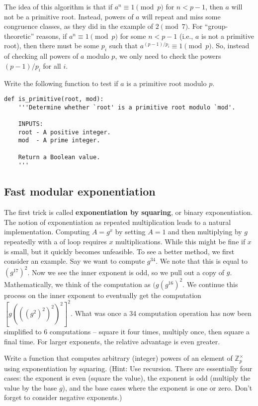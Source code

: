 The idea of this algorithm is that if $a^n \equiv 1 \pmod{p}$ for $n<p-1$, then $a$ will not be a primitive root.
Instead, powers of $a$ will repeat and miss some congruence classes, as they did in the example of $2 \pmod{7}$.
For ``group-theoretic'' reasons, if $a^n \equiv 1 \pmod{p}$ for some $n<p-1$ (i.e., $a$ is not a primitive root), then there must be some $p_i$ such that $a^{(p-1)/p_i} \equiv 1 \pmod{p}$.
So, instead of checking all powers of $a$ modulo $p$, we only need to check the powers $(p-1)/p_i$ for all $i$.

\begin{problem}
Write the following function to test if $a$ is a primitive root modulo $p$.
\begin{lstlisting}
def is_primitive(root, mod):
    '''Determine whether `root' is a primitive root modulo `mod'.
    
    INPUTS:
    root - A positive integer.
    mod  - A prime integer.
    
    Return a Boolean value.
    '''
\end{lstlisting}
\end{problem}


\subsection*{Fast modular exponentiation}



The first trick is called {\bf exponentiation by squaring}, or binary exponentiation. The notion of exponentiation as repeated multiplication leads to a natural implementation. Computing $A = g^x$ by setting $A=1$ and then multiplying by $g$ repeatedly with a of loop requires $x$ multiplications. While this might be fine if $x$ is small, but it quickly becomes unfeasible. To see a better method, we first consider an example. Say we want to compute $g^{34}$. We note that this is equal to $(g^{17})^2$. Now we see the inner exponent is odd, so we pull out a copy of $g$.  Mathematically, we think of the computation as $(g(g^{16})^2$. We continue this process on the inner exponent to eventually get the computation $[g(((g^2)^2)^2)^2]^2$. What was once a 34 computation operation has now been simplified to 6 computations -- square it four times, multiply once, then square a final time. For larger exponents, the relative advantage is even greater.

\begin{problem}
Write a function that computes arbitrary (integer) powers of an element of $\mathbb{Z}_p^\times$ using exponentiation by squaring. (Hint: Use recursion. There are essentially four cases: the exponent is even (square the value), the exponent is odd (multiply the value by the base $g$), and the base cases where the exponent is one or zero. Don't forget to consider negative exponents.)
\end{problem}

